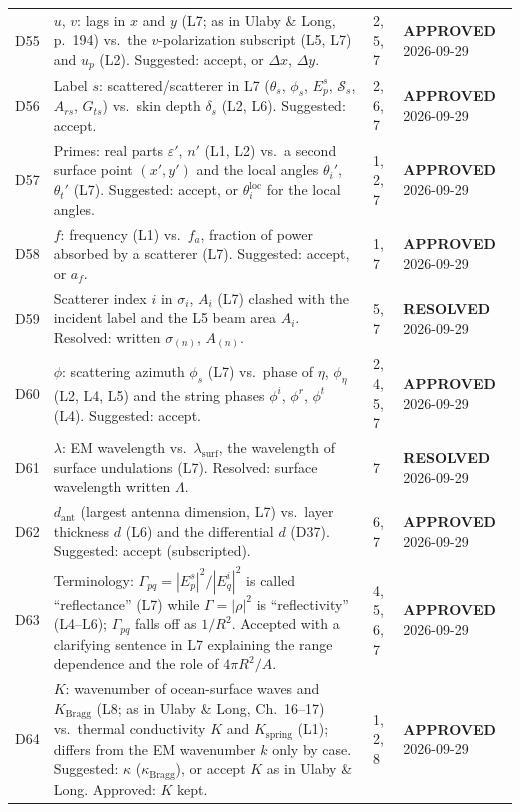\documentclass[11pt, oneside]{article}
\newcommand{\approved}{\textbf{APPROVED}}
\newcommand{\resolved}{\textbf{RESOLVED}}
\begin{document}
\begin{longtable}{l >{\raggedright\arraybackslash}p{} l l}
D55 & $u$, $v$: lags in $x$ and $y$ (L7; as in Ulaby \& Long, p.~194) vs.\ the $v$-polarization subscript (L5, L7) and $u_p$ (L2). Suggested: accept, or $\Delta x$, $\Delta y$. & 2, 5, 7 & \approved{} 2026-09-29 \\
D56 & Label $s$: scattered/scatterer in L7 ($\theta_s$, $\phi_s$, $E_p^s$, $\mathcal{S}_s$, $A_{rs}$, $G_{ts}$) vs.\ skin depth $\delta_s$ (L2, L6). Suggested: accept. & 2, 6, 7 & \approved{} 2026-09-29 \\
D57 & Primes: real parts $\varepsilon'$, $n'$ (L1, L2) vs.\ a second surface point $(x',y')$ and the local angles $\theta_i'$, $\theta_t'$ (L7). Suggested: accept, or $\theta_i^\mathrm{loc}$ for the local angles. & 1, 2, 7 & \approved{} 2026-09-29 \\
D58 & $f$: frequency (L1) vs.\ $f_a$, fraction of power absorbed by a scatterer (L7). Suggested: accept, or $a_f$. & 1, 7 & \approved{} 2026-09-29 \\
D59 & Scatterer index $i$ in $\sigma_i$, $A_i$ (L7) clashed with the incident label and the L5 beam area $A_i$. Resolved: written $\sigma_{(n)}$, $A_{(n)}$. & 5, 7 & \resolved{} 2026-09-29 \\
D60 & $\phi$: scattering azimuth $\phi_s$ (L7) vs.\ phase of $\eta$, $\phi_\eta$ (L2, L4, L5) and the string phases $\phi^i$, $\phi^r$, $\phi^t$ (L4). Suggested: accept. & 2, 4, 5, 7 & \approved{} 2026-09-29 \\
D61 & $\lambda$: EM wavelength vs.\ $\lambda_\mathrm{surf}$, the wavelength of surface undulations (L7). Resolved: surface wavelength written $\Lambda$. & 7 & \resolved{} 2026-09-29 \\
D62 & $d_\mathrm{ant}$ (largest antenna dimension, L7) vs.\ layer thickness $d$ (L6) and the differential $d$ (D37). Suggested: accept (subscripted). & 6, 7 & \approved{} 2026-09-29 \\
D63 & Terminology: $\Gamma_{pq} = |E_p^s|^2/|E_q^i|^2$ is called ``reflectance'' (L7) while $\Gamma = |\rho|^2$ is ``reflectivity'' (L4--L6); $\Gamma_{pq}$ falls off as $1/R^2$. Accepted with a clarifying sentence in L7 explaining the range dependence and the role of $4\pi R^2/A$. & 4, 5, 6, 7 & \approved{} 2026-09-29 \\
D64 & $K$: wavenumber of ocean-surface waves and $K_\mathrm{Bragg}$ (L8; as in Ulaby \& Long, Ch.~16--17) vs.\ thermal conductivity $K$ and $K_\mathrm{spring}$ (L1); differs from the EM wavenumber $k$ only by case. Suggested: $\kappa$ ($\kappa_\mathrm{Bragg}$), or accept $K$ as in Ulaby \& Long. Approved: $K$ kept. & 1, 2, 8 & \approved{} 2026-09-29 \\

\end{longtable}
\end{document}
